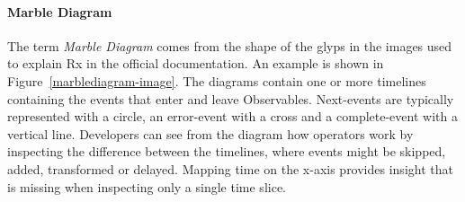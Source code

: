 \paragraph{Marble Diagram}
\label{marblediagram}
The term \textit{Marble Diagram} comes from the shape of the glyps in the images used to explain Rx in the official documentation. An example is shown in Figure~\ref{marblediagram-image}.
The diagrams contain one or more timelines containing the events that enter and leave Observables. 
Next-events are typically represented with a circle, an error-event with a cross and a complete-event with a vertical line.
Developers can see from the diagram how operators work by inspecting the difference between the timelines, 
where events might be skipped, added, transformed or delayed. 
Mapping time on the x-axis provides insight that is missing when inspecting only a single time slice. 